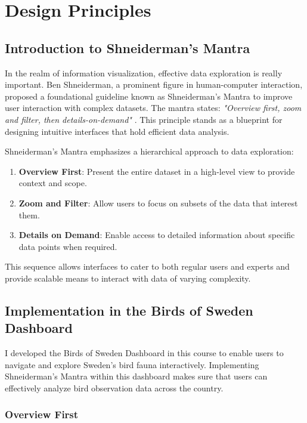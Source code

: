 \chapter{Design Principles}

\section{Introduction to Shneiderman's Mantra}

In the realm of information visualization, effective data exploration is really important. Ben Shneiderman, a prominent figure in human-computer interaction, proposed a foundational guideline known as Shneiderman's Mantra to improve user interaction with complex datasets. The mantra states: \textit{"Overview first, zoom and filter, then details-on-demand"} \cite{hampdatavisualizationSchneidermansMantra2016}. This principle stands as a blueprint for designing intuitive interfaces that hold efficient data analysis.

Shneiderman's Mantra emphasizes a hierarchical approach to data exploration:

\begin{enumerate} 
    \item \textbf{Overview First}: Present the entire dataset in a high-level view to provide context and scope. \item \textbf{Zoom and Filter}: Allow users to focus on subsets of the data that interest them. 
    \item \textbf{Details on Demand}: Enable access to detailed information about specific data points when required. 
\end{enumerate}

This sequence allows interfaces to cater to both regular users and experts and provide scalable means to interact with data of varying complexity.

\section{Implementation in the Birds of Sweden Dashboard}

I developed the Birds of Sweden Dashboard in this course to enable users to navigate and explore Sweden's bird fauna interactively. Implementing Shneiderman's Mantra within this dashboard makes sure that users can effectively analyze bird observation data across the country.

\subsection{Overview First}

